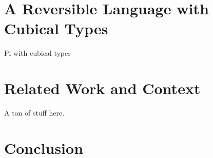\documentclass[authoryear,preprint]{sigplanconf}
\begin{document}
\section{A Reversible Language with Cubical Types} 

Pi with cubical types

\section{Related Work and Context}

A ton of stuff here. 

\section{Conclusion}


\softraggedright

\end{document}
